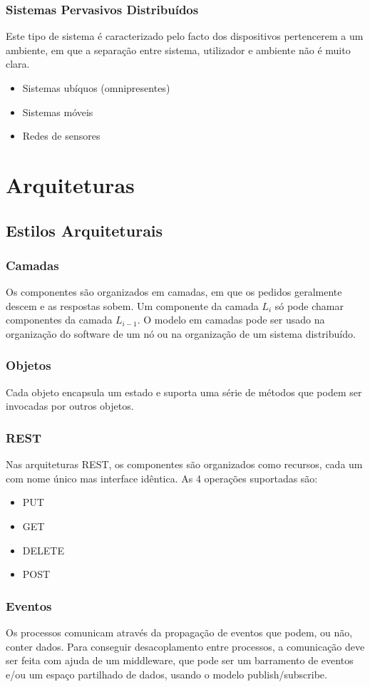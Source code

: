 \documentclass[10pt,a4paper]{report}
\begin{document}
\subsection{Sistemas Pervasivos Distribuídos}
Este tipo de sistema é caracterizado pelo facto dos dispositivos pertencerem a um ambiente, em que a separação entre sistema, utilizador e ambiente não é muito clara.
\begin{itemize}
\item Sistemas ubíquos (omnipresentes)
\item Sistemas móveis
\item Redes de sensores
\end{itemize}

\chapter{Arquiteturas}
\section{Estilos Arquiteturais}
\subsection{Camadas}
Os componentes são organizados em camadas, em que os pedidos geralmente descem e as respostas sobem. Um componente da camada $L_i$ só pode chamar componentes da camada $L_{i-1}$. O modelo em camadas pode ser usado na organização do software de um nó ou na organização de um sistema distribuído.
\subsection{Objetos}
Cada objeto encapsula um estado e suporta uma série de métodos que podem ser invocadas por outros objetos.
\subsection{REST}
Nas arquiteturas REST, os componentes são organizados como recursos, cada um com nome único mas interface idêntica. As 4 operações suportadas são:
\begin{itemize}
\item PUT
\item GET
\item DELETE
\item POST
\end{itemize}
\subsection{Eventos}
Os processos comunicam através da propagação de eventos que podem, ou não, conter dados. Para conseguir desacoplamento entre processos, a comunicação deve ser feita
com ajuda de um middleware, que pode ser um barramento de eventos e/ou um espaço partilhado de dados, usando o modelo publish/subscribe.
\end{document}
